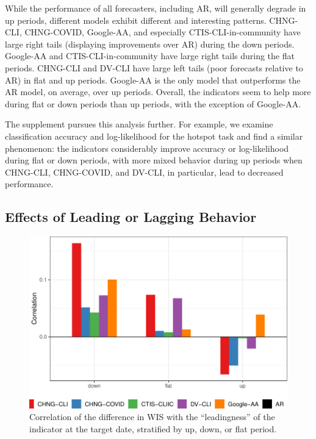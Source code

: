 \documentclass[9pt,twocolumn,twoside,lineno]{pnas-new}
\begin{document}
While the performance of all forecasters, including AR, will generally degrade
in up periods, different models exhibit different and interesting patterns.
CHNG-CLI, CHNG-COVID, Google-AA, and especially CTIS-CLI-in-community have
large right tails (displaying improvements over AR) during the down periods. 
Google-AA and CTIS-CLI-in-community have large right tails during the flat
periods. CHNG-CLI and DV-CLI have large left tails (poor forecasts relative to
AR) in flat and up periods.  Google-AA is the only model that outperforms
the AR model, on average, over up periods.  Overall, the indicators seem to help
more during flat or down periods than up periods, with the exception of
Google-AA.    

The supplement pursues this analysis further.  For example, we examine
classification accuracy and log-likelihood for the hotspot task and find a
similar phenomenon: the indicators considerably improve accuracy or
log-likelihood during flat or down periods, with more mixed behavior during up
periods when CHNG-CLI, CHNG-COVID, and DV-CLI, in particular, lead to decreased  
performance.

\subsection{Effects of Leading or Lagging Behavior}

\begin{figure}[t]
  \includegraphics[width=\columnwidth]{fig/leading-only-1.pdf}
  \caption{Correlation of the difference in WIS with the ``leadingness'' of the
    indicator at the target date, stratified by up, down, or flat period.} 
  \label{fig:leading}
\end{figure}
\end{document}
